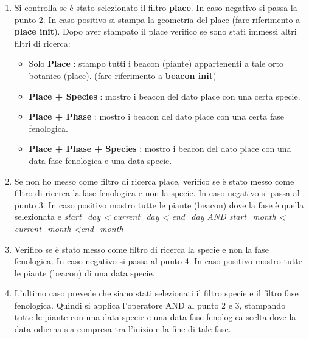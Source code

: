 \begin{enumerate}
\item Si controlla se è stato selezionato il filtro \textbf{place}. In caso negativo si passa la punto 2. \newline In caso positivo si stampa la geometria del place (fare riferimento a\textbf{ place init}). Dopo aver stampato il place verifico se sono stati immessi altri filtri di ricerca:
\begin{itemize}
\item Solo \textbf{Place} : stampo tutti i beacon (piante) appartenenti a tale orto botanico (place). (fare riferimento a \textbf{beacon init})
\item \textbf{Place + Species} : mostro i beacon del dato place con una certa specie.
\item \textbf{Place + Phase} : mostro i beacon del dato place con una certa fase fenologica.
\item \textbf{Place + Phase + Species} : mostro i beacon del dato place con una data fase fenologica e una data specie.
\end{itemize}
\item Se non ho messo come filtro di ricerca place, verifico se è stato messo come filtro di ricerca la fase fenologica e non la specie. \newline
In caso negativo si passa al punto 3. \newline In caso positivo mostro tutte le piante (beacon) dove la fase è quella selezionata e  \textit{start\_day < current\_day < end\_day AND \newline start\_month < current\_month <end\_month }
\item Verifico se è stato messo come filtro di ricerca la specie e non la fase fenologica. In caso negativo si passa al punto 4. \newline In caso positivo mostro tutte le piante (beacon) di una data specie.
\item L'ultimo caso prevede che siano stati selezionati il filtro specie e il filtro fase fenologica. Quindi si applica l'operatore AND al punto 2 e 3, stampando tutte le piante con una data specie e una data fase fenologica scelta dove la data odierna sia compresa tra l'inizio e la fine di tale fase.
\end{enumerate}


